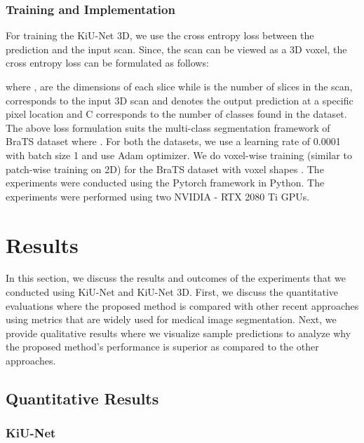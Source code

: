 \documentclass[journal,twoside,web]{ieeecolor}
\begin{document}
\subsubsection{Training and Implementation}

For training the KiU-Net 3D, we use the cross entropy loss  between the prediction and the input scan. Since, the scan can be viewed as a 3D voxel,  the cross entropy loss can be formulated as follows:
\setlength{\belowdisplayskip}{2pt} \setlength{\belowdisplayshortskip}{2pt}
\setlength{\abovedisplayskip}{2pt} \setlength{\abovedisplayshortskip}{2pt}

where ,  are the dimensions of each slice while  is the number of slices in the scan,  corresponds to the input 3D scan and   denotes the output prediction at a specific pixel location  and  C corresponds to the number of classes found in the dataset. The above loss formulation suits the multi-class segmentation framework of BraTS dataset where . For both the datasets, we use a learning rate of 0.0001 with batch size 1 and use Adam optimizer. We do voxel-wise training (similar to patch-wise training on 2D) for the BraTS dataset with voxel shapes . The experiments were conducted using the Pytorch framework in Python. The experiments were performed using two NVIDIA - RTX 2080 Ti GPUs.   





\section{Results}

In this section, we discuss the results and outcomes of the experiments that we conducted using KiU-Net and KiU-Net 3D. First, we discuss the quantitative evaluations where  the proposed method is compared with other recent approaches using    metrics that are widely used for medical image segmentation. Next, we provide qualitative results where we  visualize sample predictions to analyze why the proposed  method's  performance is superior as compared to  the other approaches.

\subsection{Quantitative Results}


\subsubsection{KiU-Net}
\end{document}
